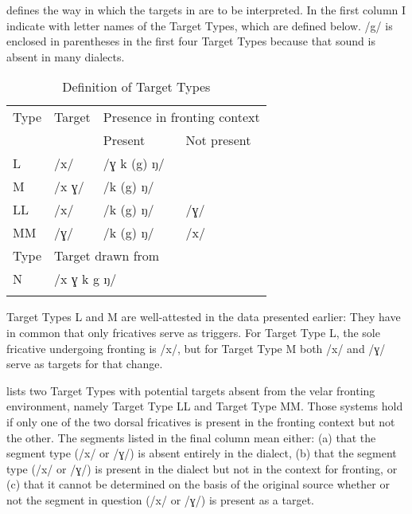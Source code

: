  defines the way in which the targets in  are to be interpreted. In the first column I indicate with letter names of the Target Types, which are defined below. /g/ is enclosed in parentheses in the first four Target Types because that sound is absent in many dialects.

\begin{table}
\caption{Definition of Target Types\label{tab:12.2}}
\begin{tabular}{llll}
\lsptoprule
Type & Target & \multicolumn{2}{c}{Presence in fronting context}\\\cmidrule(lr){3-4}
     &         & Present & Not present\\\midrule
L & /x/ & /ɣ k (g) ŋ/\\
M & /x ɣ/ & /k (g) ŋ/\\
LL & /x/ & /k (g) ŋ/ & /ɣ/ \\
MM & /ɣ/ & /k (g) ŋ/ & /x/\\\midrule
Type & \multicolumn{3}{l}{Target drawn from}\\\midrule
N & \multicolumn{3}{l}{/x ɣ k g ŋ/}\\
\lspbottomrule
\end{tabular}
\end{table}

Target Types L and M are well-attested in the data presented earlier: They have in common that only fricatives serve as triggers. For Target Type L, the sole fricative undergoing fronting is /x/, but for Target Type M both /x/ and /ɣ/ serve as targets for that change.

 lists two Target Types with potential targets absent from the velar fronting environment, namely Target Type LL and Target Type MM. Those systems hold if only one of the two dorsal fricatives is present in the fronting context but not the other. The segments listed in the final column mean either: (a) that the segment type (/x/ or /ɣ/) is absent entirely in the dialect, (b) that the segment type (/x/ or /ɣ/) is present in the dialect but not in the context for fronting, or (c) that it cannot be determined on the basis of the original source whether or not the segment in question (/x/ or /ɣ/) is present as a target. 

